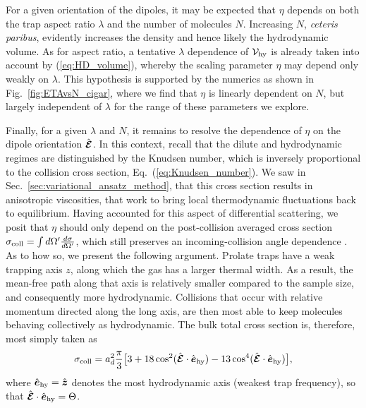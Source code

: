 \documentclass[reprint, amsmath, amssymb, aps, superscriptaddress]{revtex4-1}
\begin{document}
For a given orientation of the dipoles, it may be expected that $\eta$ depends on both the trap aspect ratio $\lambda$ and the number of molecules $N$.  Increasing $N$, {\it ceteris paribus}, evidently increases the density and hence likely the hydrodynamic volume.  As for aspect ratio, a tentative $\lambda$ dependence of ${\cal V}_{\rm hy}$ is already taken into account by (\ref{eq:HD_volume}), whereby the scaling parameter $\eta$ may depend only weakly on $\lambda$. 
This hypothesis is supported by the numerics as shown in Fig.~\ref{fig:ETAvsN_cigar}, where we find that $\eta$ is linearly dependent on $N$, but largely independent of $\lambda$ for the range of these parameters we explore.


Finally, for a given $\lambda$ and $N$, it remains to resolve the dependence of $\eta$ on the dipole orientation $\hat{\boldsymbol{{\cal E}}}$. 
In this context, recall that the dilute and hydrodynamic regimes are distinguished by the Knudsen number, which is inversely proportional to the collision cross section, Eq.~(\ref{eq:Knudsen_number}).   
We saw in Sec.~\ref{sec:variational_ansatz_method}, that this cross section results in anisotropic viscosities, that work to bring local thermodynamic fluctuations back to equilibrium. 
Having accounted for this aspect of differential scattering, we posit that $\eta$ should only depend on the post-collision averaged cross section $\sigma_{\rm coll} = \int d\Omega' \frac{ d\sigma }{ d\Omega' }$, which still preserves an incoming-collision angle dependence \cite{Bohn14_PRA}. As to how so, we present the following argument. 
Prolate traps have a weak trapping axis $z$, along which the gas has a larger thermal width. As a result, the mean-free path along that axis is relatively smaller compared to the sample size, and consequently more hydrodynamic.
Collisions that occur with relative momentum directed along the long axis, are then most able to keep molecules behaving collectively as hydrodynamic.  
The bulk total cross section is, therefore, most simply taken as 
\begin{align} \label{eq:postcollision_averaged_cross_section}
    \sigma_{\rm coll}
    =
    a_d^2 \frac{ \pi }{ 3 }
    \big[
    3 
    +
    18 \cos^2 ( \hat{\boldsymbol{{\cal E}}} \cdot \hat{\boldsymbol{e}}_{\rm hy} )
    -
    13 \cos^4 ( \hat{\boldsymbol{{\cal E}}} \cdot \hat{\boldsymbol{e}}_{\rm hy} )
    \big],
\end{align}
where $\hat{\boldsymbol{e}}_{\rm hy} = \hat{\boldsymbol{z}}$ denotes the most hydrodynamic axis (weakest trap frequency), so that $\hat{\boldsymbol{{\cal E}}} \cdot \hat{\boldsymbol{e}}_{\rm hy} = \Theta$. 
\end{document}
